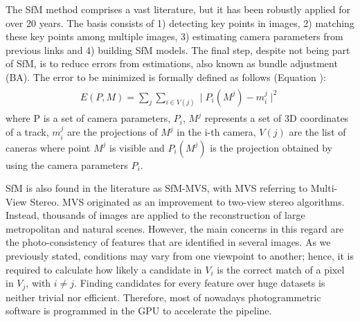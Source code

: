 The SfM method comprises a vast literature, but it has been robustly applied for over 20 years. The basis consists of 1) detecting key points in images, 2) matching these key points among multiple images, 3) estimating camera parameters from previous links and 4) building SfM models. The final step, despite not being part of SfM, is to reduce errors from estimations, also known as bundle adjustment (BA). The error to be minimized is formally defined as follows (Equation ):
\begin{gather}
    \label{eq:error_bundle_adjustment}
    \begin{aligned}
        E(P, M) = \sum_{j} \sum_{i \in V(j)} \mid P_i(M^j) - m_{i}^{j} \mid^2
    \end{aligned}
\end{gather}
where P is a set of camera parameters, ${P_i}$, $M^j$ represents a set of 3D coordinates of a track, $m_{i}^{j}$ are the projections of $M^j$ in the i-th camera, $V(j)$ are the list of caneras where point $M^j$ is visible and $P_i(M^j)$ is the projection obtained by using the camera parameters $P_i$.

SfM is also found in the literature as SfM-MVS, with MVS referring to Multi-View Stereo. MVS originated as an improvement to two-view stereo algorithms. Instead, thousands of images are applied to the reconstruction of large metropolitan and natural scenes. However, the main concerns in this regard are the photo-consistency of features that are identified in several images. As we previously stated, conditions may vary from one viewpoint to another; hence, it is required to calculate how likely a candidate in $V_i$ is the correct match of a pixel in $V_j$, with $i \neq j$. Finding candidates for every feature over huge datasets is neither trivial nor efficient. Therefore, most of nowadays photogrammetric software is programmed in the GPU to accelerate the pipeline.

